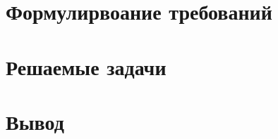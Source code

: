 \section{Формулирвоание требований}
\label{sec:features}
\blindtext
\section{Решаемые задачи}
\label{sec:tasks}
\blindtext
\section{Вывод}
\label{sec:task_concl}
\blindtext